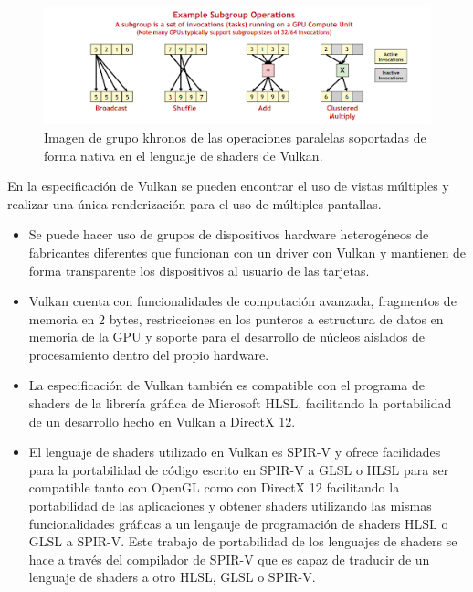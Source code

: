 \documentclass[a4paper, 17pt]{book}
\begin{document}
\begin{figure}[hbt!]
    \centering
    \includegraphics[scale=0.75, keepaspectratio]{img/vulkan_op.png}
    \caption{Imagen de grupo khronos de las operaciones paralelas soportadas de forma nativa en el lenguaje de shaders de Vulkan.}
    \label{figura:khronos}
\end{figure}

En la especificación de Vulkan se pueden encontrar el uso de vistas múltiples y realizar una única renderización
para el uso de múltiples pantallas.


\begin{itemize}
  \item Se puede hacer uso de grupos de dispositivos hardware heterogéneos de fabricantes diferentes que
  funcionan con un driver con Vulkan y mantienen de forma transparente los dispositivos al usuario de las tarjetas.
  
  \item Vulkan cuenta con funcionalidades de computación avanzada, fragmentos de memoria en 2 bytes, restricciones en
  los punteros a estructura de datos en memoria de la GPU y soporte para el desarrollo de núcleos aislados de
  procesamiento dentro del propio hardware.

  \item La especificación de Vulkan también es compatible con el programa de shaders de la librería gráfica de Microsoft
  HLSL, facilitando la portabilidad de un desarrollo hecho en Vulkan a DirectX 12.

  \item El lenguaje de shaders utilizado en Vulkan es SPIR-V y ofrece facilidades para la portabilidad de código escrito
  en SPIR-V a GLSL o HLSL para ser compatible tanto con OpenGL como con DirectX 12 facilitando la portabilidad de las
  aplicaciones y obtener shaders utilizando las mismas funcionalidades gráficas a un lengauje de programación de
  shaders HLSL o GLSL a SPIR-V.  Este trabajo de portabilidad de los lenguajes de shaders se hace a través del
  compilador de SPIR-V que es capaz de traducir de un lenguaje de shaders a otro HLSL, GLSL o SPIR-V. 
  
\end{itemize}
\end{document}
